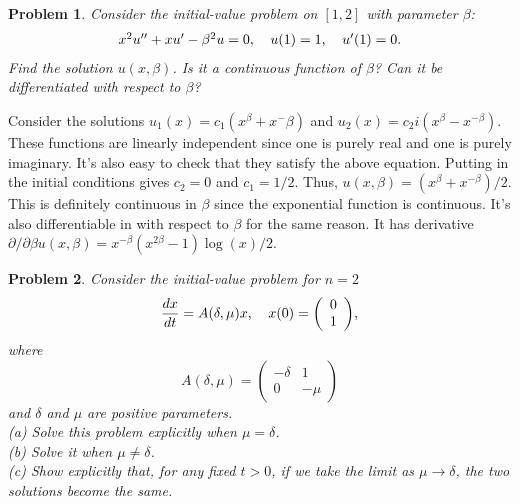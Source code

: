 \documentclass{article}
\newtheorem{problem}{Problem}
\begin{document}
\begin{problem}
Consider the initial-value problem on $[1,2]$ with parameter $\beta$:
\[
\begin{tabular}{ccc}
$x^2 u'' + x u' - \beta^2 u = 0$, & $u(1) = 1$, & $u'(1) = 0$.
\end{tabular}
\]
Find the solution $u(x,\beta)$. Is it a continuous function of $\beta$? Can it be differentiated with respect to $\beta$?
\end{problem}

Consider the solutions $u_1(x) = c_1(x^{\beta} + x^-{\beta})$ and $u_2(x) = c_2 i (x^{\beta} - x^{-{\beta}})$. These functions are linearly independent since one is purely real and one is purely imaginary. It's also easy to check that they satisfy the above equation. Putting in the initial conditions gives $c_2 = 0$ and $c_1 = 1/2$. Thus, $u(x, \beta) = (x^{\beta} + x^{-\beta})/2$. This is definitely continuous in $\beta$ since the exponential function is continuous. It's also differentiable in with respect to $\beta$ for the same reason. It has derivative $\partial/\partial \beta u(x, \beta) = x^{-\beta} (x^{2 \beta} - 1) \log(x)/2$.

\begin{problem}
Consider the initial-value problem for $n = 2$
\[
\begin{tabular}{cc}
$\displaystyle{\frac{dx}{dt} = A(\delta, \mu)x}$, & $\displaystyle{x(0) = \left ( \begin{array}{c} 0\\ 1 \end{array} \right )}$,
\end{tabular}
\]
where
\[
A(\delta, \mu) =
\left (
\begin{array}{cc}
-\delta & 1\\
0 & -\mu
\end{array}
\right )
\]
and $\delta$ and $\mu$ are positive parameters.\\
(a) Solve this problem explicitly when $\mu = \delta$.\\
(b) Solve it when $\mu \neq \delta$.\\
(c) Show explicitly that, for any fixed $t > 0$, if we take the limit as $\mu \rightarrow \delta$, the two solutions become the same.
\end{problem}
\end{document}
